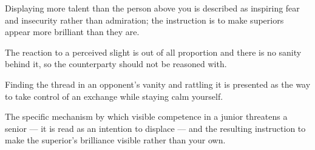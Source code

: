 

\begin{distilled}
  \item Displaying more talent than the person above you is described as inspiring fear and insecurity rather than admiration; the instruction is to make superiors appear more brilliant than they are.
  \item The reaction to a perceived slight is out of all proportion and there is no sanity behind it, so the counterparty should not be reasoned with.
  \item Finding the thread in an opponent's vanity and rattling it is presented as the way to take control of an exchange while staying calm yourself.
\end{distilled}

\begin{unique}
  \item The specific mechanism by which visible competence in a junior threatens a senior --- it is read as an intention to displace --- and the resulting instruction to make the superior's brilliance visible rather than your own.
\end{unique}
